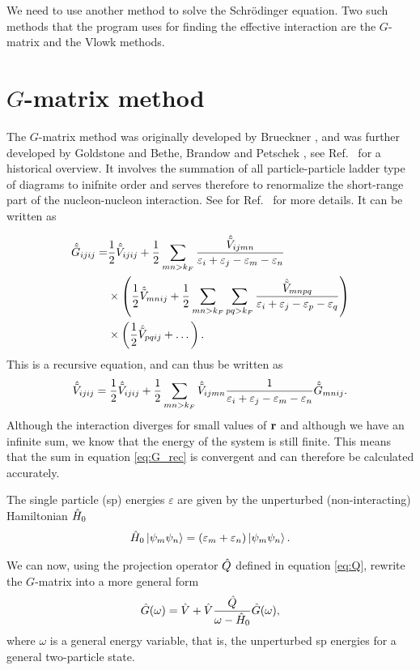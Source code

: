 We need to use another method to solve the Schr\"{o}dinger equation. Two such
methods that the program uses for finding the effective interaction are the
$G$-matrix and the Vlowk methods.

\section{$G$-matrix method}

The $G$-matrix method was originally developed by Brueckner \citep{brueck}, and
was further developed by Goldstone \citep{gold} and Bethe, Brandow and
Petschek \citep{bbp}, see Ref.~\cite{g261} for a historical overview. It involves the summation of all particle-particle ladder type of
diagrams to inifnite order and serves therefore to renormalize the short-range part of the nucleon-nucleon interaction. 
See for Ref.~\citep{g261} for more details. It can be written as

\begin{align}
	\hat{\tilde{G}}_{ijij} =& \frac{1}{2}\hat{\tilde{V}}_{ijij} + \frac{1}{2}\sum_{mn>k_F}
	\frac{\hat{\tilde{V}}_{ijmn}}
	{\varepsilon_i+\varepsilon_j-\varepsilon_m-\varepsilon_n}\notag
	\\&\times \left(\frac{1}{2}\hat{\tilde{V}}_{mnij}+\frac{1}{2}\sum_{mn>k_F}
	\sum_{pq>k_F}\frac{\hat{\tilde{V}}_{mnpq}}
	{\varepsilon_i+\varepsilon_j-\varepsilon_p-\varepsilon_q}\right)\notag
	\\&\times\left(\frac{1}{2}\hat{\tilde{V}}_{pqij}+\dots\right).
\end{align}
This is a recursive equation, and can thus be written as
\begin{align}
	\vv_{ijij} = \frac{1}{2}\vv_{ijij} + \frac{1}{2}\sum_{mn>k_F}
	\vv_{ijmn}\frac{1}
	{\varepsilon_i+\varepsilon_j-\varepsilon_m-\varepsilon_n}\gg_{mnij}.
	\label{eq:G_rec}
\end{align}
Although the interaction diverges for small values of $\bf r$ and although we
have an infinite sum, we know that the energy of the system is still finite.
This means that the sum in equation \ref{eq:G_rec} is convergent and can
therefore be calculated accurately.

The single particle (sp) energies $\varepsilon$ are given by the unperturbed
(non-interacting) Hamiltonian $\hat{H}_0$
\begin{align}
	\hat{H}_0\left| \psi_m\psi_n \right\rangle=(\varepsilon_m+\varepsilon_n)\left| \psi_m\psi_n \right\rangle.
\end{align}

We can now, using the projection operator $\hat{Q}$ defined in equation \ref{eq:Q},
rewrite the $G$-matrix into a more general form
\begin{align}
	\g(\omega) = \v+\v\frac{\q}{\omega -\h_0}\g(\omega),
	\label{eq:G}
\end{align}
where $\omega$ is a general energy variable, that is, the unperturbed sp
energies for a general two-particle state.

